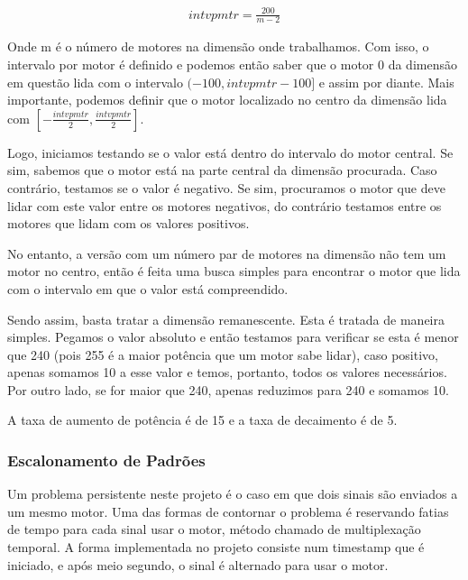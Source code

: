 \documentclass{sig-alternate-05-2015}
\begin{document}
            \begin{gather*}
                intvpmtr = \frac{200}{m-2}
            \end{gather*}
            
            Onde m é o número de motores na dimensão onde trabalhamos.
            Com isso, o intervalo por motor é definido e podemos então saber
            que o motor 0 da dimensão em questão lida com o intervalo $(-100,
            intvpmtr-100]$ e assim por diante. Mais importante, podemos definir
            que o motor localizado no centro da dimensão lida com
            $[-\frac{intvpmtr}{2}, \frac{intvpmtr}{2}]$.
            
            Logo, iniciamos testando se o valor está dentro do intervalo do
            motor central. Se sim, sabemos que o motor está na parte central da
            dimensão procurada. Caso contrário, testamos se o valor é negativo.
            Se sim, procuramos o motor que deve lidar com este valor entre os
            motores negativos, do contrário testamos entre os motores que lidam
            com os valores positivos.
            
            No entanto, a versão com um número par de motores na dimensão não
            tem um motor no centro, então é feita uma busca simples para
            encontrar o motor que lida com o intervalo em que o valor está
            compreendido.
            
            Sendo assim, basta tratar a dimensão remanescente. Esta é tratada
            de maneira simples. Pegamos o valor absoluto e então testamos para
            verificar se esta é menor que 240 (pois 255 é a maior potência que
            um motor sabe lidar), caso positivo, apenas somamos 10 a esse valor
            e temos, portanto, todos os valores necessários. Por outro lado, se
            for maior que 240, apenas reduzimos para 240 e somamos 10.
            
            A taxa de aumento de potência é de 15 e a taxa de decaimento é de 5.
        
        \subsubsection{Escalonamento de Padrões}
            Um problema persistente neste projeto é o caso em que dois sinais
            são enviados a um mesmo motor. Uma das formas de contornar o
            problema é reservando fatias de tempo para cada sinal usar o motor,
            método chamado de multiplexação temporal. A forma implementada no
            projeto consiste num timestamp que é iniciado, e após meio segundo,
            o sinal é alternado para usar o motor.
\end{document}
